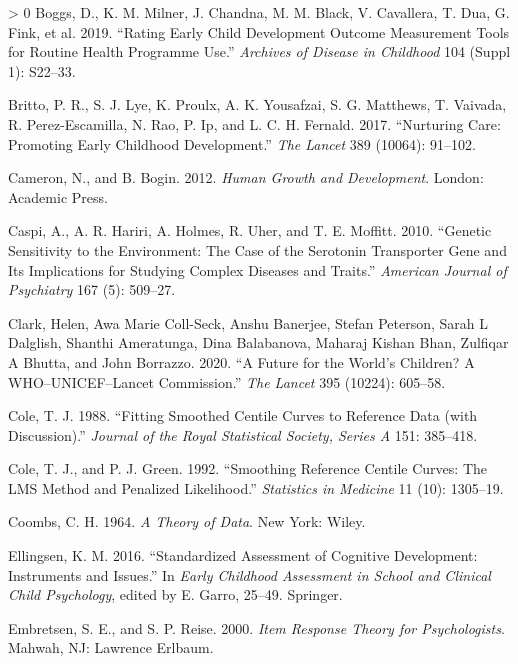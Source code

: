 \documentclass[
]{book}
\newlength{\cslhangindent}
\newenvironment{CSLReferences}[3] %
 {%
  \setlength{\parindent}{0pt}
  \ifodd #1 \everypar{\setlength{\hangindent}{\cslhangindent}}\ignorespaces\fi
  \ifnum #2 > 0
  \setlength{\parskip}{#2\baselineskip}
  \fi
 }%
 {}
\begin{document}
\begin{CSLReferences}{1}{0}
\leavevmode\hypertarget{ref-boggs2019}{}%
Boggs, D., K. M. Milner, J. Chandna, M. M. Black, V. Cavallera, T. Dua, G. Fink, et al. 2019. {``Rating Early Child Development Outcome Measurement Tools for Routine Health Programme Use.''} \emph{Archives of Disease in Childhood} 104 (Suppl 1): S22--33.

\leavevmode\hypertarget{ref-britto2017}{}%
Britto, P. R., S. J. Lye, K. Proulx, A. K. Yousafzai, S. G. Matthews, T. Vaivada, R. Perez-Escamilla, N. Rao, P. Ip, and L. C. H. Fernald. 2017. {``Nurturing Care: Promoting Early Childhood Development.''} \emph{The Lancet} 389 (10064): 91--102.

\leavevmode\hypertarget{ref-cameron2012}{}%
Cameron, N., and B. Bogin. 2012. \emph{Human Growth and Development}. London: Academic Press.

\leavevmode\hypertarget{ref-caspi2010genetic}{}%
Caspi, A., A. R. Hariri, A. Holmes, R. Uher, and T. E. Moffitt. 2010. {``Genetic Sensitivity to the Environment: The Case of the Serotonin Transporter Gene and Its Implications for Studying Complex Diseases and Traits.''} \emph{American Journal of Psychiatry} 167 (5): 509--27.

\leavevmode\hypertarget{ref-clark2020}{}%
Clark, Helen, Awa Marie Coll-Seck, Anshu Banerjee, Stefan Peterson, Sarah L Dalglish, Shanthi Ameratunga, Dina Balabanova, Maharaj Kishan Bhan, Zulfiqar A Bhutta, and John Borrazzo. 2020. {``A Future for the World's Children? A WHO--UNICEF--Lancet Commission.''} \emph{The Lancet} 395 (10224): 605--58.

\leavevmode\hypertarget{ref-cole1988}{}%
Cole, T. J. 1988. {``Fitting Smoothed Centile Curves to Reference Data (with Discussion).''} \emph{Journal of the Royal Statistical Society, Series A} 151: 385--418.

\leavevmode\hypertarget{ref-cole1992}{}%
Cole, T. J., and P. J. Green. 1992. {``Smoothing Reference Centile Curves: The {LMS} Method and Penalized Likelihood.''} \emph{Statistics in Medicine} 11 (10): 1305--19.

\leavevmode\hypertarget{ref-coombs1964}{}%
Coombs, C. H. 1964. \emph{A Theory of Data}. New York: Wiley.

\leavevmode\hypertarget{ref-ellingsen2016}{}%
Ellingsen, K. M. 2016. {``Standardized Assessment of Cognitive Development: Instruments and Issues.''} In \emph{Early Childhood Assessment in School and Clinical Child Psychology}, edited by E. Garro, 25--49. Springer.

\leavevmode\hypertarget{ref-embretsen2000}{}%
Embretsen, S. E., and S. P. Reise. 2000. \emph{Item Response Theory for Psychologists}. Mahwah, NJ: Lawrence Erlbaum.


\end{CSLReferences}
\end{document}
